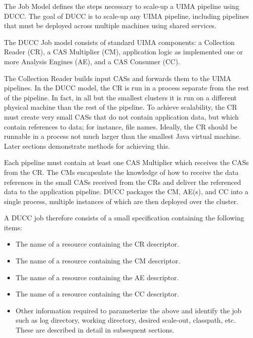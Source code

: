     The Job Model defines the steps necessary to scale-up a UIMA pipeline using DUCC.  The goal of
    DUCC is to scale-up any UIMA pipeline, including pipelines that must be deployed across multiple
    machines using shared services.

    The DUCC Job model consists of standard UIMA components: a Collection Reader (CR), a CAS
    Multiplier (CM), application logic as implemented one or more Analysis Engines (AE), and a CAS
    Consumer (CC).

    The Collection Reader builds input CASs and forwards them to the UIMA pipelines.  In the DUCC
    model, the CR is run in a process separate from the rest of the pipeline. In fact, in all but the
    smallest clusters it is run on a different physical machine than the rest of the pipeline.  To
    achieve scalability, the CR must create very small CASs that do not contain application data,
    but which contain references to data; for instance, file names.  Ideally, the CR should be
    runnable in a process not much larger than the smallest Java virtual machine.  Later sections
    demonstrate methods for achieving this.

    Each pipeline must contain at least one CAS Multiplier which receives the CASs from the CR.  The
    CMs encapsulate the knowledge of how to receive the data references in the small CASs received
    from the CRs and deliver the referenced data to the application pipeline.  DUCC packages the CM,
    AE(s), and CC into a single process, multiple instances of which are then deployed over the
    cluster.

    A DUCC job therefore consists of a small specification containing the following items:
    
    \begin{itemize}
      \item The name of a resource containing the CR descriptor.
      \item The name of a resource containing the CM descriptor.
      \item The name of a resource containing the AE descriptor.
      \item The name of a resource containing the CC descriptor.
      \item Other information required to parameterize the above and identify the job
        such as log directory, working directory, desired scale-out, classpath, etc.
        These are described in detail in subsequent sections.
    \end{itemize}

